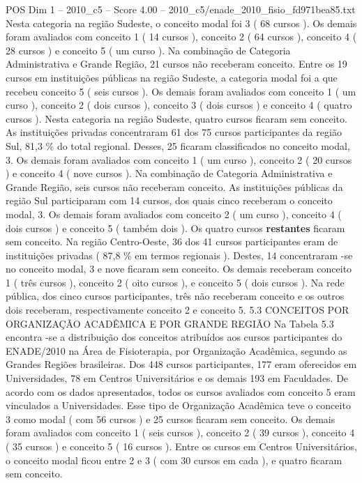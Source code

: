 \begin{textsample}{POS Dim 1 – 2010\_c5 – Score 4.00 – 2010\_c5/enade\_2010\_fisio\_fd971bea85.txt}
Nesta categoria na região Sudeste, o conceito modal foi 3 ( 68 cursos ).
Os demais foram avaliados com conceito 1 ( 14 cursos ), conceito 2 ( 64 cursos ), conceito 4 ( 28 cursos ) e conceito 5 ( um curso ).
Na combinação de Categoria Administrativa e Grande Região, 21 cursos não receberam conceito.
Entre os 19 cursos em instituições públicas na região Sudeste, a categoria modal foi a que recebeu conceito 5 ( seis cursos ).
Os demais foram avaliados com conceito 1 ( um curso ), conceito 2 ( dois cursos ), conceito 3 ( dois cursos ) e conceito 4 ( quatro cursos ).
Nesta categoria na região Sudeste, quatro cursos ficaram sem conceito.
As instituições privadas concentraram 61 dos 75 cursos participantes da região Sul, 81,3 \% do total regional.
Desses, 25 ficaram classificados no conceito modal, 3.
Os demais foram avaliados com conceito 1 ( um curso ), conceito 2 ( 20 cursos ) e conceito 4 ( nove cursos ).
Na combinação de Categoria Administrativa e Grande Região, seis cursos não receberam conceito.
As instituições públicas da região Sul participaram com 14 cursos, dos quais cinco receberam o conceito modal, 3.
Os demais foram avaliados com conceito 2 ( um curso ), conceito 4 ( dois cursos ) e conceito 5 ( também dois ).
Os quatro cursos \textbf{restantes} ficaram sem conceito.
Na região Centro-Oeste, 36 dos 41 cursos participantes eram de instituições privadas ( 87,8 \% em termos regionais ).
Destes, 14 concentraram -se no conceito modal, 3 e nove ficaram sem conceito.
Os demais receberam conceito 1 ( três cursos ), conceito 2 ( oito cursos ), e conceito 5 ( dois cursos ).
Na rede pública, dos cinco cursos participantes, três não receberam conceito e os outros dois receberam, respectivamente conceito 2 e conceito 5. 5.3 CONCEITOS POR ORGANIZAÇÃO ACADÊMICA E POR GRANDE REGIÃO Na Tabela 5.3 encontra -se a distribuição dos conceitos atribuídos aos cursos participantes do ENADE/2010 na Área de Fisioterapia, por Organização Acadêmica, segundo as Grandes Regiões brasileiras.
Dos 448 cursos participantes, 177 eram oferecidos em Universidades, 78 em Centros Universitários e os demais 193 em Faculdades.
De acordo com os dados apresentados, todos os cursos avaliados com conceito 5 eram vinculados a Universidades.
Esse tipo de Organização Acadêmica teve o conceito 3 como modal ( com 56 cursos ) e 25 cursos ficaram sem conceito.
Os demais foram avaliados com conceito 1 ( seis cursos ), conceito 2 ( 39 cursos ), conceito 4 ( 35 cursos ) e conceito 5 ( 16 cursos ).
Entre os cursos em Centros Universitários, o conceito modal ficou entre 2 e 3 ( com 30 cursos em cada ), e quatro ficaram sem conceito.

\end{textsample}
